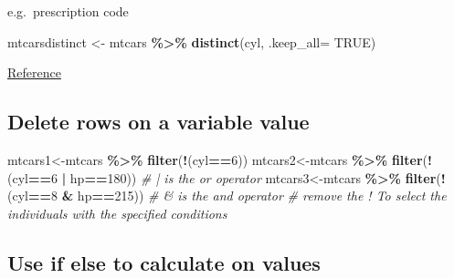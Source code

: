 \documentclass[
]{article}
\newenvironment{Shaded}{\begin{snugshade}}{\end{snugshade}}
\newcommand{\AttributeTok}[1]{\textcolor[rgb]{0.13,0.29,0.53}{#1}}
\newcommand{\CommentTok}[1]{\textcolor[rgb]{0.56,0.35,0.01}{\textit{#1}}}
\newcommand{\ConstantTok}[1]{\textcolor[rgb]{0.56,0.35,0.01}{#1}}
\newcommand{\DecValTok}[1]{\textcolor[rgb]{0.00,0.00,0.81}{#1}}
\newcommand{\FunctionTok}[1]{\textcolor[rgb]{0.13,0.29,0.53}{\textbf{#1}}}
\newcommand{\NormalTok}[1]{#1}
\newcommand{\OtherTok}[1]{\textcolor[rgb]{0.56,0.35,0.01}{#1}}
\newcommand{\SpecialCharTok}[1]{\textcolor[rgb]{0.81,0.36,0.00}{\textbf{#1}}}
\begin{document}
e.g.~prescription code

\begin{Shaded}
\begin{Highlighting}[]
\NormalTok{mtcarsdistinct }\OtherTok{\textless{}{-}}\NormalTok{ mtcars }\SpecialCharTok{\%\textgreater{}\%}    \FunctionTok{distinct}\NormalTok{(cyl, }\AttributeTok{.keep\_all=} \ConstantTok{TRUE}\NormalTok{)}
\end{Highlighting}
\end{Shaded}

\href{http://www.datasciencemadesimple.com/remove-duplicate-rows-r-using-dplyr-distinct-function}{Reference}

\hypertarget{delete-rows-on-a-variable-value}{%
\subsection{Delete rows on a variable value}\label{delete-rows-on-a-variable-value}}

\begin{Shaded}
\begin{Highlighting}[]
\NormalTok{mtcars1}\OtherTok{\textless{}{-}}\NormalTok{mtcars }\SpecialCharTok{\%\textgreater{}\%} \FunctionTok{filter}\NormalTok{(}\SpecialCharTok{!}\NormalTok{(cyl}\SpecialCharTok{==}\DecValTok{6}\NormalTok{))}
\NormalTok{mtcars2}\OtherTok{\textless{}{-}}\NormalTok{mtcars }\SpecialCharTok{\%\textgreater{}\%} \FunctionTok{filter}\NormalTok{(}\SpecialCharTok{!}\NormalTok{(cyl}\SpecialCharTok{==}\DecValTok{6} \SpecialCharTok{|}\NormalTok{ hp}\SpecialCharTok{==}\DecValTok{180}\NormalTok{)) }\CommentTok{\# | is the \textquotesingle{}or\textquotesingle{} operator}
\NormalTok{mtcars3}\OtherTok{\textless{}{-}}\NormalTok{mtcars }\SpecialCharTok{\%\textgreater{}\%} \FunctionTok{filter}\NormalTok{(}\SpecialCharTok{!}\NormalTok{(cyl}\SpecialCharTok{==}\DecValTok{8} \SpecialCharTok{\&}\NormalTok{ hp}\SpecialCharTok{==}\DecValTok{215}\NormalTok{)) }\CommentTok{\# \& is the \textquotesingle{}and\textquotesingle{} operator}
\CommentTok{\# remove the ! To select the individuals with the specified conditions}
\end{Highlighting}
\end{Shaded}

\hypertarget{use-if-else-to-calculate-on-values}{%
\subsection{Use if else to calculate on values}\label{use-if-else-to-calculate-on-values}}
\end{document}
